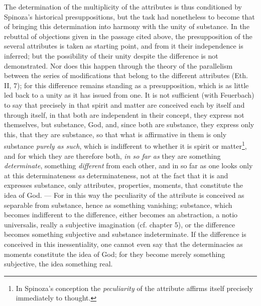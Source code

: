 \documentclass[12pt,a4paper,openany]{book}
\newcommand{\opage}[1]{\marginnote{\footnotesize\textit{[#1]}}}
\begin{document}
The determination of the multiplicity of the attributes is thus conditioned by
Spinoza's historical presuppositions, but the task had nonetheless to become
that of bringing this determination into harmony with the unity of substance. In the
rebuttal of objections given in the passage cited above,
the presupposition of the several attributes is taken as starting point, and from it
their independence is inferred; but the possibility of their unity despite
the difference is not demonstrated. Nor does this happen through the theory of the
parallelism between the series of modifications that belong to the
different attributes (Eth. II, 7); for this difference remains
standing as a presupposition, which is as little led back to a
unity as it has issued from one. It is not sufficient
(with Feuerbach) to say that precisely in that spirit and matter are conceived
each by itself and through itself, in that both are independent in their concept,
they express not themselves, but substance, God, and, since both are
substance, they express only this, that they are substance, so that what is
affirmative in them is only substance \emph{purely as such}, which is
indifferent to whether it is spirit or matter\footnote{In Spinoza's
conception the \emph{peculiarity} of the attribute affirms itself precisely immediately
to thought.}, and for which they are therefore both, \emph{in so far as} they are
something \emph{determinate}, something \emph{different} from each other, and
in so far as one looks only at this determinateness \emph{as} determinateness,
not at the fact that it is and expresses substance, only attributes,
properties, moments, that constitute the idea of God. --- For in this way
the peculiarity of the attribute is conceived as separable from
substance, hence as something vanishing; substance, which becomes
indifferent to the difference, either becomes an abstraction, a notio
universalis,
\opage{53} really a subjective imagination (cf. chapter 5), or the difference
becomes something subjective and substance indeterminate. If the
difference is conceived in this inessentiality, one cannot even say that
the determinacies as moments constitute the idea of God; for they become merely
something subjective, the idea something real.
\end{document}
